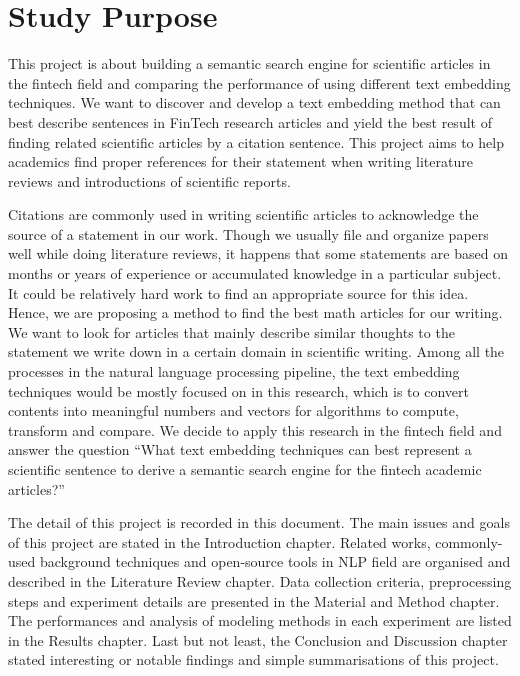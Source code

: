 \section{Study Purpose}
This project is about building a semantic search engine for scientific articles in the fintech field and comparing the performance of using different text embedding techniques.
We want to discover and develop a text embedding method that can best describe sentences in FinTech research articles and yield the best result of finding related scientific articles by a citation sentence.
This project aims to help academics find proper references for their statement when writing literature reviews and introductions of scientific reports.

Citations are commonly used in writing scientific articles to acknowledge the source of a statement in our work.
Though we usually file and organize papers well while doing literature reviews, it happens that some statements are based on months or years of experience or accumulated knowledge in a particular subject.
It could be relatively hard work to find an appropriate source for this idea.
Hence, we are proposing a method to find the best math articles for our writing.
We want to look for articles that mainly describe similar thoughts to the statement we write down in a certain domain in scientific writing.
Among all the processes in the natural language processing pipeline, the text embedding techniques would be mostly focused on in this research, which is to convert contents into meaningful numbers and vectors for algorithms to compute, transform and compare.
We decide to apply this research in the fintech field and answer the question “What text embedding techniques can best represent a scientific sentence to derive a semantic search engine for the fintech academic articles?”

The detail of this project is recorded in this document.
The main issues and goals of this project are stated in the Introduction chapter.
Related works, commonly-used background techniques and open-source tools in NLP field are organised and described in the Literature Review chapter.
Data collection criteria, preprocessing steps and experiment details are presented in the Material and Method chapter.
The performances and analysis of modeling methods in each experiment are listed in the Results chapter.
Last but not least, the Conclusion and Discussion chapter stated interesting or notable findings and simple summarisations of this project.

